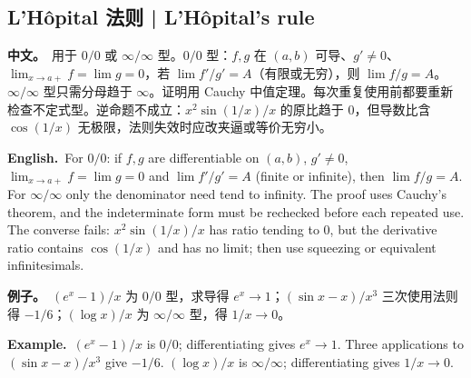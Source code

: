\documentclass[UTF8,11pt,a4paper]{ctexart}
\newcommand{\BOTH}[2]{\par\noindent\textbf{中文。}\ #1\par\noindent\textbf{English.}\ #2\par}
\newcommand{\EX}[2]{\par\noindent\textbf{例子。}\ #1\par\noindent\textbf{Example.}\ #2\par}
\begin{document}
\subsection{L'H\^opital 法则 | L'H\^opital's rule}
\BOTH{用于 $0/0$ 或 $\infty/\infty$ 型。$0/0$ 型：$f,g$ 在 $(a,b)$ 可导、$g'\ne0$、$\lim_{x\to a+}f=\lim g=0$，若 $\lim f'/g'=A$（有限或无穷），则 $\lim f/g=A$。$\infty/\infty$ 型只需分母趋于 $\infty$。证明用 Cauchy 中值定理。每次重复使用前都要重新检查不定式型。逆命题不成立：$x^2\sin(1/x)/x$ 的原比趋于 $0$，但导数比含 $\cos(1/x)$ 无极限，法则失效时应改夹逼或等价无穷小。}{For $0/0$: if $f,g$ are differentiable on $(a,b)$, $g'\ne0$, $\lim_{x\to a+}f=\lim g=0$ and $\lim f'/g'=A$ (finite or infinite), then $\lim f/g=A$. For $\infty/\infty$ only the denominator need tend to infinity. The proof uses Cauchy's theorem, and the indeterminate form must be rechecked before each repeated use. The converse fails: $x^2\sin(1/x)/x$ has ratio tending to $0$, but the derivative ratio contains $\cos(1/x)$ and has no limit; then use squeezing or equivalent infinitesimals.}
\EX{$(e^x-1)/x$ 为 $0/0$ 型，求导得 $e^x\to1$；$(\sin x-x)/x^3$ 三次使用法则得 $-1/6$；$(\log x)/x$ 为 $\infty/\infty$ 型，得 $1/x\to0$。}{$(e^x-1)/x$ is $0/0$; differentiating gives $e^x\to1$. Three applications to $(\sin x-x)/x^3$ give $-1/6$. $(\log x)/x$ is $\infty/\infty$; differentiating gives $1/x\to0$.}
\end{document}
